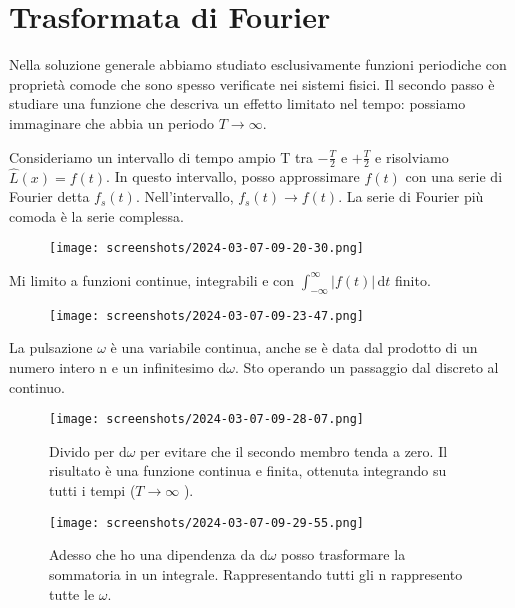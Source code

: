 \section{Trasformata di Fourier}

Nella soluzione generale abbiamo studiato esclusivamente funzioni periodiche con proprietà comode che sono spesso verificate nei sistemi fisici. Il secondo passo è studiare una funzione che descriva un effetto limitato nel tempo: possiamo immaginare che abbia un periodo \(T \to \infty \).

Consideriamo un intervallo di tempo ampio T tra \(-\frac{T}{2}\) e \(+\frac{T}{2}\) e risolviamo \(\hat{L} (x) = f(t)\). In questo intervallo, posso approssimare \(f(t)\) con una serie di Fourier detta \(f_s(t)\). Nell'intervallo, \(f_s(t)\to f(t)\). La serie di Fourier più comoda è la serie complessa.

\begin{figure}[H]
	\centering
	\texttt{[image: screenshots/2024-03-07-09-20-30.png]}
\end{figure}

Mi limito a funzioni continue, integrabili e con \(\int_{-\infty}^{\infty} \vert f(t) \vert  \,\mathrm{d}t \) finito.

\begin{figure}[H]
	\centering
	\texttt{[image: screenshots/2024-03-07-09-23-47.png]}
\end{figure}

La pulsazione \(\omega \) è una variabile continua, anche se è data dal prodotto di un numero intero n e un infinitesimo \(\mathrm{d} \omega  \). Sto operando un passaggio dal discreto al continuo. 

\begin{figure}[H]
	\centering
	\texttt{[image: screenshots/2024-03-07-09-28-07.png]}
	\caption{Divido per \(\mathrm{d}\omega  \) per evitare che il secondo membro tenda a zero. Il risultato è una funzione continua e finita, ottenuta integrando su tutti i tempi (\(T \to \infty \) ). }
\end{figure}

\begin{figure}[H]
	\centering
	\texttt{[image: screenshots/2024-03-07-09-29-55.png]}
	\caption{Adesso che ho una dipendenza da \(\mathrm{d}\omega  \) posso trasformare la sommatoria in un integrale. Rappresentando tutti gli n rappresento tutte le \(\omega \).  }
\end{figure}

